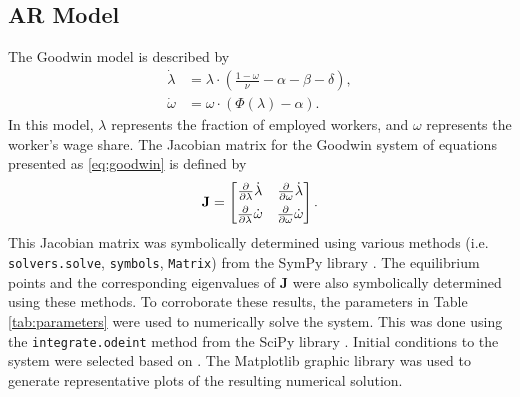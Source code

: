 \documentclass[12pt, centerh1]{article}
\begin{document}
\subsection{AR Model}
The Goodwin model is described by
\begin{equation}\label{eq:goodwin} 
\begin{split}
    \dot{\lambda} &= \lambda \cdot \left( \frac{1-\omega}{\nu} - \alpha - \beta - \delta \right), \\
    \dot{\omega} &= \omega \cdot (\Phi(\lambda) - \alpha).
\end{split}
\end{equation}
In this model, $\lambda$ represents the fraction of employed workers, and $\omega$ represents the worker's wage share. The Jacobian matrix for the Goodwin system of equations presented as \eqref{eq:goodwin} is defined by
\begin{equation} \label{eq:goodwinJ}
\mathbf J =
\begin{bmatrix}
    \pdv{\lambda}\dot{\lambda} & \pdv{\omega}\dot{\lambda}\\[1ex]
    \pdv{\lambda}\dot{\omega} & \pdv{\omega}\dot{\omega}
\end{bmatrix}.
\end{equation}
This Jacobian matrix was symbolically determined using various methods (i.e. \texttt{solvers.solve}, \texttt{symbols}, \texttt{Matrix}) from the SymPy library \citep{SymPy}.  The equilibrium points and the corresponding eigenvalues of $\mathbf J$ were also symbolically determined using these methods. To corroborate these results, the parameters in Table \ref{tab:parameters} were used to numerically solve the system. This was done using the \texttt{integrate.odeint} method from the SciPy library \citep{2020SciPy-NMeth}. Initial conditions to the system were selected based on \citet{grasselli2012analysis}. The Matplotlib \citep{matplotlib} graphic library was used to generate representative plots of the resulting numerical solution.
\end{document}
